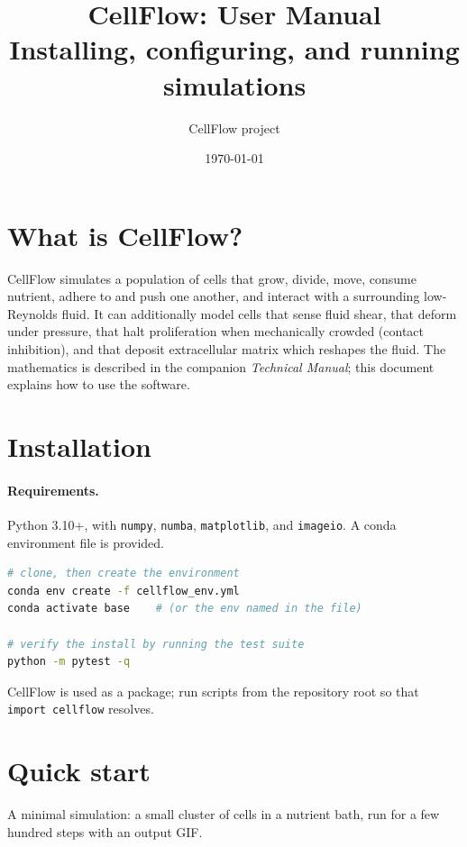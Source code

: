 \documentclass[11pt]{article}
\title{\textbf{CellFlow: User Manual}\\[0.3em]
\large Installing, configuring, and running simulations}
\author{CellFlow project}
\date{\today}
\newcommand{\code}[1]{\texttt{#1}}
\begin{document}
\maketitle
\tableofcontents
\bigskip

\section{What is CellFlow?}
CellFlow simulates a population of cells that grow, divide, move, consume
nutrient, adhere to and push one another, and interact with a surrounding
low-Reynolds fluid. It can additionally model cells that sense fluid shear, that
deform under pressure, that halt proliferation when mechanically crowded
(contact inhibition), and that deposit extracellular matrix which reshapes the
fluid. The mathematics is described in the companion \emph{Technical Manual};
this document explains how to use the software.

\section{Installation}

\paragraph{Requirements.} Python 3.10+, with \code{numpy}, \code{numba},
\code{matplotlib}, and \code{imageio}. A conda environment file is provided.

\begin{lstlisting}[language=bash]
# clone, then create the environment
conda env create -f cellflow_env.yml
conda activate base    # (or the env named in the file)

# verify the install by running the test suite
python -m pytest -q
\end{lstlisting}

CellFlow is used as a package; run scripts from the repository root so that
\code{import cellflow} resolves.

\section{Quick start}

A minimal simulation: a small cluster of cells in a nutrient bath, run for a few
hundred steps with an output GIF.
\end{document}
